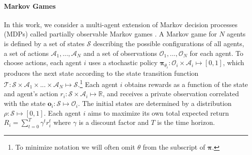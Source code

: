 \documentclass{article}
\newcommand{\comment}[1]{\textbf{\textcolor{red}{comment: #1}}}
\newcommand{\pol}[0]{\pmb{\pi}}
\begin{document}
\paragraph{Markov Games}
In this work, we consider a multi-agent extension of Markov decision processes (MDPs) called partially observable Markov games \cite{littman1994markov}. A Markov game for $N$ agents is defined by a set of states $\mathcal{S}$ describing the possible configurations of all agents, a set of actions $\mathcal{A}_1,...,\mathcal{A}_N$ and a set of observations $\mathcal{O}_1,...,\mathcal{O}_N$ for each agent. To choose actions, each agent $i$ uses a stochastic policy $\pol_{\theta_i} : \mathcal{O}_i \times \mathcal{A}_i \mapsto [0,1]$, which produces the next state according to the state transition function $\mathcal{T} : \mathcal{S} \times \mathcal{A}_1 \times ... \times \mathcal{A}_N \mapsto \mathcal{S}$.\footnote{To minimize notation we will often omit $\theta$ from the subscript of $\pol$.} 
Each agent $i$ obtains rewards as a function of the state and agent's action $r_i : \mathcal{S} \times \mathcal{A}_i \mapsto \mathbb{R}$, and receives a private observation correlated with the state $\mathbf{o}_i : \mathcal{S} \mapsto \mathcal{O}_i$. The initial states are determined by a distribution $\rho : \mathcal{S} \mapsto [0,1]$. Each agent $i$ aims to maximize its own total expected return $R_i = \sum_{t=0}^T \gamma^t r^t_i$ where $\gamma$ is a discount factor and $T$ is the time horizon.

\end{document}
